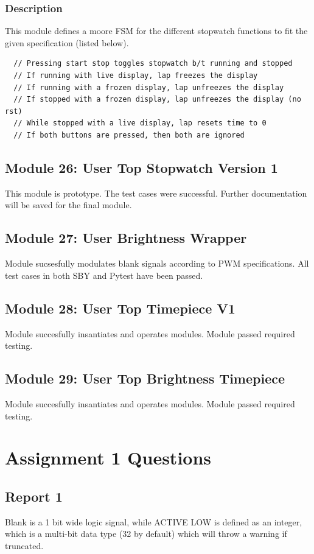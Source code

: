 \documentclass{report}
\begin{document}
\subsubsection{Description}
This module defines a moore FSM for the different stopwatch functions to fit the 
given specification (listed below).
\begin{verbatim}
  // Pressing start stop toggles stopwatch b/t running and stopped
  // If running with live display, lap freezes the display
  // If running with a frozen display, lap unfreezes the display
  // If stopped with a frozen display, lap unfreezes the display (no rst)
  // While stopped with a live display, lap resets time to 0
  // If both buttons are pressed, then both are ignored
\end{verbatim}

\subsection{Module 26: User Top Stopwatch Version 1}
This module is prototype. The test cases were successful. Further documentation 
will be saved for the final module. 

\subsection{Module 27: User Brightness Wrapper}
Module sucsesfully modulates blank signals according to PWM specifications. 
All test cases in both SBY and Pytest have been passed.

\subsection{Module 28: User Top Timepiece V1}
Module succesfully insantiates and operates modules. Module passed required 
testing.

\subsection{Module 29: User Top Brightness Timepiece}
Module succesfully insantiates and operates modules. Module passed required 
testing.

\section{Assignment 1 Questions}

\subsection{Report 1}
Blank is a 1 bit wide logic signal, while ACTIVE LOW is defined as 
an integer, which is a multi-bit data type (32 by default) which will 
throw a warning if truncated.
\end{document}
